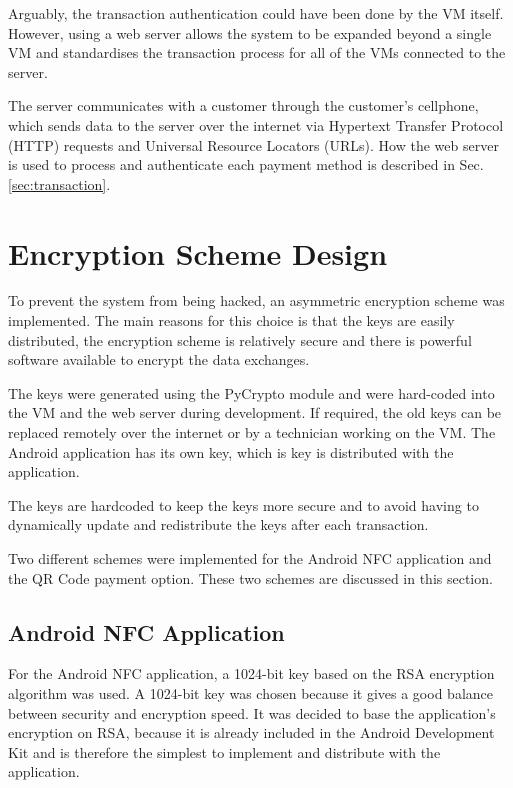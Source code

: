 Arguably, the transaction authentication could have been done by the VM itself. However,
using a web server allows the system to be expanded beyond a single VM and
standardises the transaction process for all of the VMs connected to the server.

The server communicates with a customer through the customer's cellphone,
which sends data to the server over the internet via Hypertext Transfer Protocol
(HTTP) requests and Universal Resource Locators (URLs). How the web server is used to
process and authenticate each payment method is described in Sec. \ref{sec:transaction}.
 
\section{Encryption Scheme Design}

To prevent the system from being hacked, an asymmetric encryption scheme was
implemented. The main reasons for this choice is that the keys are easily
distributed, the encryption scheme is relatively secure and there is powerful
software available to encrypt the data exchanges.

The keys were generated using the PyCrypto module and were hard-coded
into the VM and the web server during development. If required, the old
keys can be replaced remotely over the internet or by a technician working on the
VM. The Android application has its own key, which is key is distributed with
the application. 

The keys are hardcoded to keep the keys more secure and to avoid having to dynamically
update and redistribute the keys after each transaction.

Two different schemes were implemented for the Android NFC application and the
QR Code payment option. These two schemes are discussed in this section.

\subsection{Android NFC Application}

For the Android NFC application, a 1024-bit key based on the RSA encryption algorithm was
used. A 1024-bit key was chosen because it gives a good balance between security and
encryption speed. It was decided to base the application's encryption on RSA, because it
is already included in the Android Development Kit and is therefore the simplest to
implement and distribute with the application.

